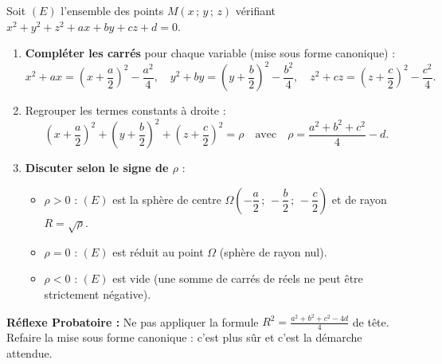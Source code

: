 \documentclass[11pt]{article}
\newcommand{\cle}[1]{{\popxbold\color{popdark}#1}}
\begin{document}
\begin{methode}
Soit $(E)$ l'ensemble des points $M(x\,;\,y\,;\,z)$ vérifiant $x^2+y^2+z^2+ax+by+cz+d=0$.
\begin{enumerate}
\item \textbf{Compléter les carrés} pour chaque variable (mise sous forme canonique) :
\[ x^2+ax = \left(x+\frac{a}{2}\right)^2-\frac{a^2}{4},\quad
   y^2+by = \left(y+\frac{b}{2}\right)^2-\frac{b^2}{4},\quad
   z^2+cz = \left(z+\frac{c}{2}\right)^2-\frac{c^2}{4}. \]
\item Regrouper les termes constants à droite :
\[ \left(x+\frac{a}{2}\right)^2+\left(y+\frac{b}{2}\right)^2+\left(z+\frac{c}{2}\right)^2 = \rho
\quad\text{avec}\quad \rho = \frac{a^2+b^2+c^2}{4}-d. \]
\item \textbf{Discuter selon le signe de $\rho$} :
\begin{itemize}
\item $\rho > 0$ : $(E)$ est la \cle{sphère} de centre $\Omega\left(-\dfrac{a}{2}\,;\,-\dfrac{b}{2}\,;\,-\dfrac{c}{2}\right)$ et de rayon $R=\sqrt{\rho}$.
\item $\rho = 0$ : $(E)$ est réduit au \cle{point} $\Omega$ (sphère de rayon nul).
\item $\rho < 0$ : $(E)$ est \cle{vide} (une somme de carrés de réels ne peut être strictement négative).
\end{itemize}
\end{enumerate}
\textbf{Réflexe Probatoire :} Ne pas appliquer la formule $R^2=\frac{a^2+b^2+c^2-4d}{4}$ de tête. Refaire la mise sous forme canonique : c'est plus sûr et c'est la démarche attendue.
\end{methode}
\end{document}
